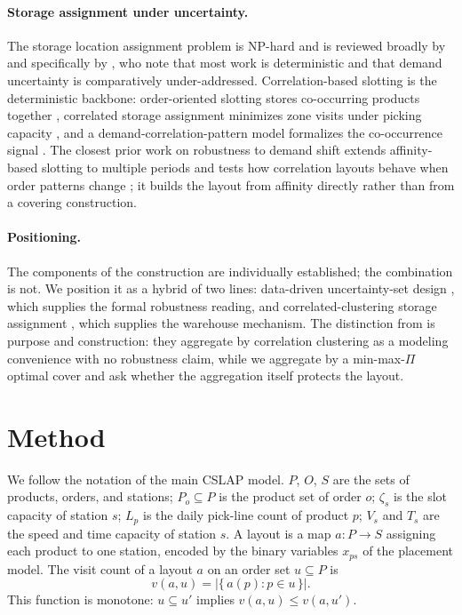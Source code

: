 \documentclass[preprint,review,11pt,authoryear]{elsarticle}
\begin{document}
\paragraph{Storage assignment under uncertainty.}
The storage location assignment problem is NP-hard and is reviewed broadly by \citet{dekoster2007} and specifically by \citet{reyes2019}, who note that most work is deterministic and that demand uncertainty is comparatively under-addressed. Correlation-based slotting is the deterministic backbone: order-oriented slotting stores co-occurring products together \citep{mantel2007}, correlated storage assignment minimizes zone visits under picking capacity \citep{xiao2012}, and a demand-correlation-pattern model formalizes the co-occurrence signal \citep{zhang2019}. The closest prior work on robustness to demand shift extends affinity-based slotting to multiple periods and tests how correlation layouts behave when order patterns change \citep{kofler2014}; it builds the layout from affinity directly rather than from a covering construction.

\paragraph{Positioning.}
The components of the construction are individually established; the combination is not. We position it as a hybrid of two lines: data-driven uncertainty-set design \citep{bgk2018}, which supplies the formal robustness reading, and correlated-clustering storage assignment \citep{xiao2012,mantel2007,zhang2019}, which supplies the warehouse mechanism. The distinction from \citet{xiao2012} is purpose and construction: they aggregate by correlation clustering as a modeling convenience with no robustness claim, while we aggregate by a min-max-$\Pi$ optimal cover and ask whether the aggregation itself protects the layout.

\section{Method}\label{sec:rc-method}

We follow the notation of the main CSLAP model. $P$, $O$, $S$ are the sets of products, orders, and stations; $P_o \subseteq P$ is the product set of order $o$; $\zeta_s$ is the slot capacity of station $s$; $L_p$ is the daily pick-line count of product $p$; $V_s$ and $T_s$ are the speed and time capacity of station $s$. A layout is a map $a: P \to S$ assigning each product to one station, encoded by the binary variables $x_{ps}$ of the placement model. The visit count of a layout $a$ on an order set $u \subseteq P$ is
\begin{equation}
v(a,u) = \big|\{\, a(p) : p \in u \,\}\big|.
\label{eq:rc-visit}
\end{equation}
This function is monotone: $u \subseteq u'$ implies $v(a,u) \le v(a,u')$.
\end{document}
